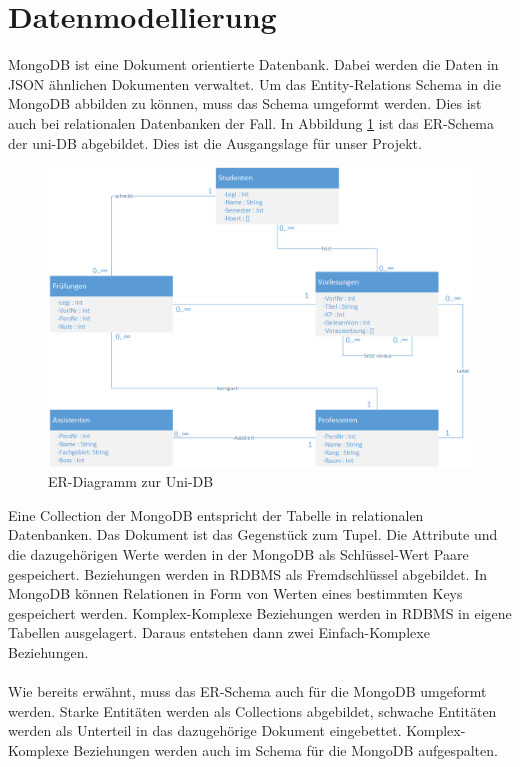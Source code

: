\section{Datenmodellierung}
\label{kap:ERDiagramm}
MongoDB ist eine Dokument orientierte Datenbank. Dabei werden die Daten in JSON
ähnlichen Dokumenten verwaltet. Um das Entity-Relations Schema in die MongoDB
abbilden zu können, muss das Schema umgeformt werden. Dies ist auch bei
relationalen Datenbanken der Fall. In Abbildung \ref{fig:uni-db} ist das
ER-Schema der uni-DB abgebildet. Dies ist die Ausgangslage für unser Projekt.
\begin{figure}[h] 
	\centering
		\includegraphics[width=1\textwidth]{./pictures/NoSQL-DB_ER_Diagramm_UNI-DB.png}
	\caption{ER-Diagramm zur Uni-DB}
	\label{fig:uni-db}
\end{figure}
Eine Collection der MongoDB entspricht der Tabelle in relationalen Datenbanken.
Das Dokument ist das Gegenstück zum Tupel. Die Attribute und die dazugehörigen
Werte werden in der MongoDB als Schlüssel-Wert Paare gespeichert.
Beziehungen werden in RDBMS als Fremdschlüssel abgebildet. In MongoDB 
können Relationen in Form von Werten eines bestimmten Keys gespeichert werden.
Komplex-Komplexe Beziehungen werden in RDBMS in eigene
Tabellen ausgelagert. Daraus entstehen dann zwei Einfach-Komplexe
Beziehungen. \\\\
Wie bereits erwähnt, muss das ER-Schema auch für die MongoDB umgeformt werden.
Starke Entitäten werden als Collections abgebildet, schwache Entitäten werden 
als Unterteil in das dazugehörige Dokument eingebettet. Komplex-Komplexe 
Beziehungen werden auch im Schema für die MongoDB aufgespalten.
